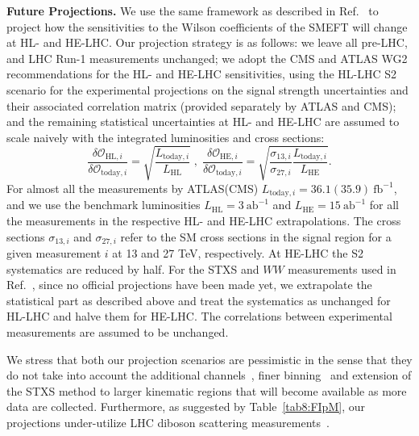\documentclass[../report.tex]{subfiles}
\begin{document}
\noindent
{\bf Future Projections.}\label{sec8:proj}
We use the same framework as described in Ref.~\cite{Ellis:2018gqa} to project how the sensitivities to the Wilson coefficients of the SMEFT will change at HL- and HE-LHC. Our projection strategy is as follows:
we leave all pre-LHC, and LHC Run-1 measurements unchanged; we adopt the CMS and ATLAS WG2 recommendations for the HL- and HE-LHC sensitivities, using the HL-LHC S2 scenario for the experimental projections on the signal strength uncertainties and their associated correlation matrix (provided separately by ATLAS and CMS);
and the remaining statistical uncertainties at HL- and HE-LHC are assumed to scale naively with the integrated luminosities and cross sections:
\begin{equation}
\frac{\delta\mathcal{O}_{\text{HL}, i}}{\delta\mathcal{O}_{\text{today}, i}} = \sqrt{\frac{L_{\text{today}, i}}{L_{\text{HL}}}} \; , \;
\frac{\delta\mathcal{O}_{\text{HE}, i}}{\delta\mathcal{O}_{\text{today}, i}} = \sqrt{\frac{\sigma_{13, i}}{\sigma_{27, i}} \frac{L_{\text{today}, i}}{L_{\text{HE}}}}  . \nonumber
\end{equation}
For almost all the measurements by ATLAS(CMS) $L_{\text{today}, i} = 36.1(35.9)~\text{fb}^{-1}$,
and we use the benchmark luminosities $L_{\text{HL}} = 3~\text{ab}^{-1}$ and $L_{\text{HE}} = 15~\text{ab}^{-1}$ for all the measurements in the respective HL- and HE-LHC extrapolations.
The cross sections $\sigma_{13, i}$ and $\sigma_{27, i}$ refer to the SM cross sections in the signal region for a given measurement $i$ at 13 and 27 TeV, respectively. At HE-LHC the S2 systematics are reduced by half. For the STXS and $WW$ measurements used in Ref.~\cite{Ellis:2018gqa}, since no official projections have been made yet, we extrapolate the statistical part as described above and treat the systematics as unchanged for HL-LHC and halve them for HE-LHC. The correlations between experimental measurements are assumed to be unchanged.

We stress that both our projection scenarios are pessimistic in the sense that they do not take into account the additional channels~\cite{gilbert:talk}, finer binning~\cite{deFlorian:2016spz, Hays:2290628, ATLAS-CONF-2017-047} and extension of the STXS method to larger kinematic regions that will become available as more data are collected.
Furthermore, as suggested by Table~\ref{tab8:FIpM}, our projections under-utilize LHC diboson scattering measurements~\cite{Azatov:2017kzw, Franceschini:2017xkh, Dawson:2018dcd}. 
\end{document}
